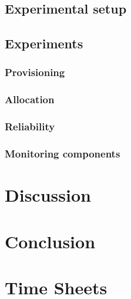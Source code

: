 \documentclass[a4paper]{IEEEtran}
\begin{document}
\subsection{Experimental setup}




\subsection{Experiments}
\subsubsection{Provisioning}

\subsubsection{Allocation}

\subsubsection{Reliability}

\subsubsection{Monitoring components}


\section{Discussion}

\section{Conclusion}

\appendix
\section{Time Sheets}
\end{document}
